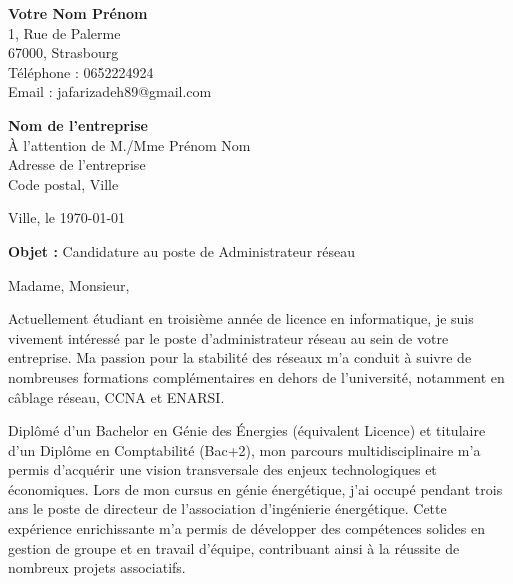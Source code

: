 \documentclass[11pt,a4paper]{letter}
\begin{document}
\begin{flushleft}
\textbf{Votre Nom Prénom} \\
1, Rue de Palerme \\
67000, Strasbourg \\
Téléphone : 0652224924 \\
Email : jafarizadeh89@gmail.com \\
\end{flushleft}


\begin{flushright}
\textbf{Nom de l'entreprise} \\
À l'attention de M./Mme Prénom Nom \\
Adresse de l'entreprise \\
Code postal, Ville \\
\end{flushright}

\vspace{3mm}

\begin{flushright}
Ville, le \today
\end{flushright}

\vspace{5mm}

\noindent\textbf{Objet :} Candidature au poste de Administrateur réseau

\vspace{0.5cm}

Madame, Monsieur,

\vspace{0.3cm}

Actuellement étudiant en troisième année de licence en informatique, je suis vivement intéressé par le poste d'administrateur réseau au sein de votre entreprise. Ma passion pour la stabilité des réseaux m'a conduit à suivre de nombreuses formations complémentaires en dehors de l'université, notamment en câblage réseau, CCNA et ENARSI.

\vspace{0.3cm}

Diplômé d'un Bachelor en Génie des Énergies (équivalent Licence) et titulaire d'un Diplôme en Comptabilité (Bac+2), mon parcours multidisciplinaire m'a permis d'acquérir une vision transversale des enjeux technologiques et économiques. Lors de mon cursus en génie énergétique, j'ai occupé pendant trois ans le poste de directeur de l’association d’ingénierie énergétique. Cette expérience enrichissante m'a permis de développer des compétences solides en gestion de groupe et en travail d'équipe, contribuant ainsi à la réussite de nombreux projets associatifs.
\end{document}
